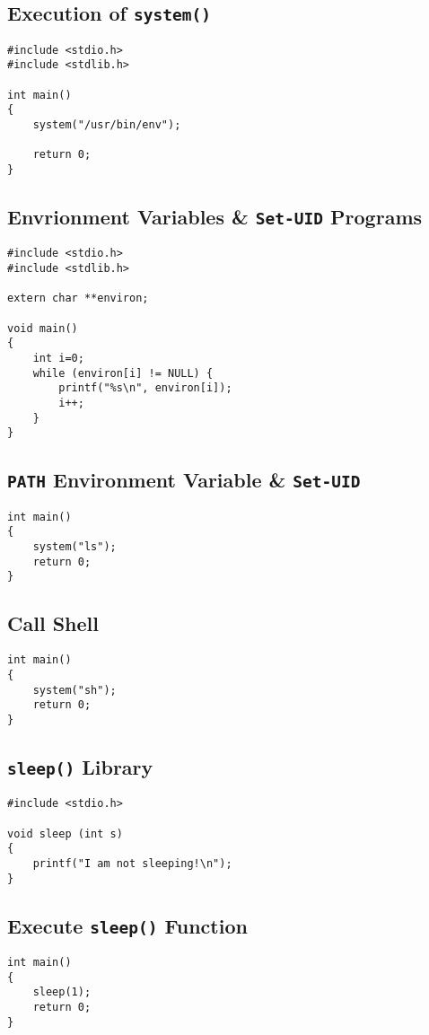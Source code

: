 \documentclass[a4paper,12pt]{article}
\begin{document}
\subsection{Execution of \texttt{system()}}
\label{Appsec:3.4}
\begin{verbatim}
#include <stdio.h>
#include <stdlib.h>

int main()
{
    system("/usr/bin/env");

    return 0;
}
\end{verbatim}
\subsection{Envrionment Variables \& \texttt{Set-UID} Programs}
\label{Appsec:3.5}
\begin{verbatim}
#include <stdio.h>
#include <stdlib.h>

extern char **environ;

void main()
{
    int i=0;
    while (environ[i] != NULL) {
        printf("%s\n", environ[i]);
        i++;
    }
}
\end{verbatim}
\subsection{\texttt{PATH} Environment Variable \& \texttt{Set-UID}}
\label{Appsec:3.6}
\begin{verbatim}
int main()
{
    system("ls");
    return 0;
}
\end{verbatim}
\subsection{Call Shell}
\label{Appsec:3.6.2}
		\begin{verbatim}
int main()
{
    system("sh");
    return 0;
}
\end{verbatim}
\subsection{\texttt{sleep()} Library}
\label{Appsec:3.7}
\begin{verbatim}
#include <stdio.h>

void sleep (int s)
{
    printf("I am not sleeping!\n");
}
\end{verbatim}
\subsection{Execute \texttt{sleep()} Function}
\begin{verbatim}
int main()
{
    sleep(1);
    return 0;
}
\end{verbatim}
\newpage
\end{document}
